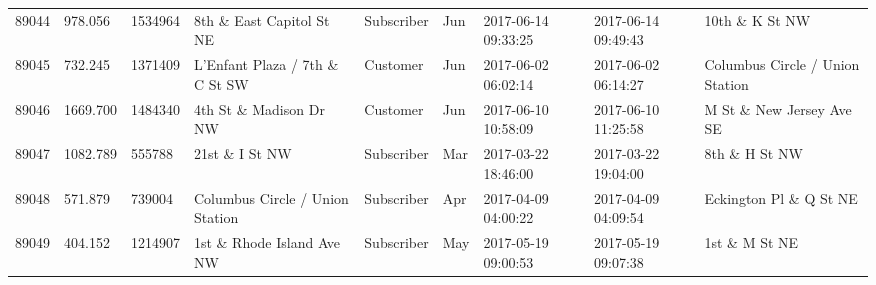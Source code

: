 \documentclass[11pt]{article}
\begin{document}
\begin{tabular}{r|llllllll}
	89044 &  978.056                                           & 1534964                                            & 8th \& East Capitol St NE                         & Subscriber                                         & Jun                                                & 2017-06-14 09:33:25                                & 2017-06-14 09:49:43                                & 10th \& K St NW                                  \\
	89045 &  732.245                                           & 1371409                                            & L'Enfant Plaza / 7th \& C St SW                   & Customer                                           & Jun                                                & 2017-06-02 06:02:14                                & 2017-06-02 06:14:27                                & Columbus Circle / Union Station                   \\
	89046 & 1669.700                                           & 1484340                                            & 4th St \& Madison Dr NW                           & Customer                                           & Jun                                                & 2017-06-10 10:58:09                                & 2017-06-10 11:25:58                                & M St \& New Jersey Ave SE                        \\
	89047 & 1082.789                                           &  555788                                            & 21st \& I St NW                                   & Subscriber                                         & Mar                                                & 2017-03-22 18:46:00                                & 2017-03-22 19:04:00                                & 8th \& H St NW                                   \\
	89048 &  571.879                                         &  739004                                          & Columbus Circle / Union Station                  & Subscriber                                       & Apr                                              & 2017-04-09 04:00:22                              & 2017-04-09 04:09:54                              & Eckington Pl \& Q St NE                        \\
	89049 &  404.152                                           & 1214907                                            & 1st \& Rhode Island Ave NW                        & Subscriber                                         & May                                                & 2017-05-19 09:00:53                                & 2017-05-19 09:07:38                                & 1st \& M St NE                                   \\

\end{tabular}
\end{document}
